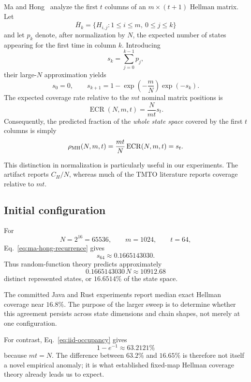 Ma and Hong~\cite{MaHong2009} analyze the first $t$ columns of an
$m\times(t+1)$ Hellman matrix.  Let
\[
   \overline H_k
   =
   \{H_{i,j}:1\leq i\leq m,\ 0\leq j\leq k\}
\]
and let $p_k$ denote, after normalization by $N$, the expected number of states
appearing for the first time in column $k$.  Introducing
\[
    s_k=\sum_{j=0}^{k-1}p_j,
\]
their large-$N$ approximation yields
\begin{equation}
    s_0=0,
    \qquad
    s_{k+1}
      =
      1-\exp\!\left(-\frac{m}{N}\right)\exp(-s_k).
    \label{eq:ma-hong-recurrence}
\end{equation}
The expected coverage rate relative to the $mt$ nominal matrix positions is
\begin{equation}
    \operatorname{ECR}(N,m,t)
      =
      \frac{N}{mt}s_t.
    \label{eq:ma-hong-ecr}
\end{equation}
Consequently, the predicted fraction of the \emph{whole state space} covered
by the first $t$ columns is simply
\begin{equation}
    \rho_{\rm MH}(N,m,t)
      =
      \frac{mt}{N}\operatorname{ECR}(N,m,t)
      =
      s_t.
    \label{eq:ma-hong-state-fraction}
\end{equation}

This distinction in normalization is particularly useful in our experiments.
The artifact reports $C_H/N$, whereas much of the TMTO literature reports
coverage relative to $mt$.

\subsection{Initial configuration}

For
\[
    N=2^{16}=65536,
    \qquad
    m=1024,
    \qquad
    t=64,
\]
Eq.~\eqref{eq:ma-hong-recurrence} gives
\[
    s_{64}\approx0.1665143030.
\]
Thus random-function theory predicts approximately
\[
    0.1665143030\,N
      \approx
      10912.68
\]
distinct represented states, or $16.6514\%$ of the state space.

The committed Java and Rust experiments report median exact Hellman coverage
near $16.8\%$.  The purpose of the larger sweep is to determine whether this
agreement persists across state dimensions and chain shapes, not merely at one
configuration.

For contrast, Eq.~\eqref{eq:iid-occupancy} gives
\[
    1-e^{-1}\approx63.2121\%
\]
because $mt=N$.  The difference between $63.2\%$ and $16.65\%$ is therefore
not itself a novel empirical anomaly; it is what established fixed-map
Hellman coverage theory already leads us to expect.

